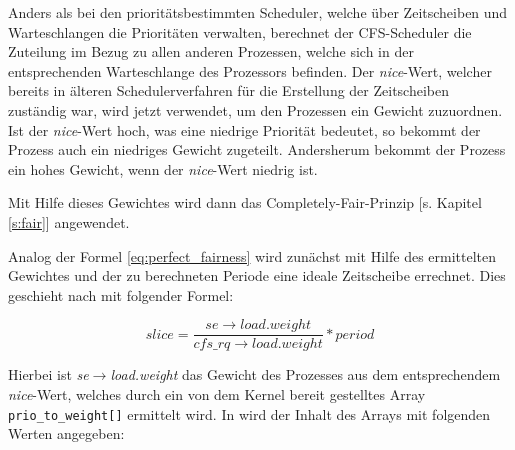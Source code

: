 Anders als bei den prioritäts\-bestim\-mten Scheduler, welche über Zeitscheiben und Warte\-schlan\-gen die Prioritäten verwalten, berechnet der CFS-Scheduler die Zuteilung im Bezug zu allen anderen Prozessen, welche sich in der entsprechenden Warteschlange des Prozessors befinden. Der  \textit{nice}-Wert, welcher bereits in älteren Scheduler\-ver\-fahren für die Erstellung der Zeitscheiben zuständig war, wird jetzt verwendet, um den Prozessen ein Gewicht zuzuordnen. Ist der  \textit{nice}-Wert hoch, was eine niedrige Priorität bedeutet, so bekommt der Prozess auch ein niedriges Gewicht zugeteilt. Andersherum bekommt der Prozess ein hohes Gewicht, wenn der  \textit{nice}-Wert niedrig ist.

Mit Hilfe dieses Gewichtes wird dann das  Completely-Fair-Prinzip [s. Kapitel \ref{s:fair}] angewendet. 

Analog der Formel \ref{eq:perfect_fairness} wird zunächst mit Hilfe des ermittelten Gewichtes und der zu berechneten  Periode eine ideale Zeitscheibe errechnet. Dies geschieht nach \cite{paperfairness} mit folgender Formel:  

\begin{equation}
slice = \frac{se\rightarrow load.weight}{cfs\_rq\rightarrow load.weight} * period
\label{eq:slice}
\end{equation}

Hierbei ist \textit{se$\rightarrow$load.weight} das Gewicht des Prozesses aus dem entsprechendem \textit{nice}-Wert, welches durch ein von dem Kernel bereit gestelltes Array \texttt{prio\_to\_weight[]} ermittelt wird. In \cite{nikita} wird der Inhalt des Arrays mit folgenden Werten angegeben:


